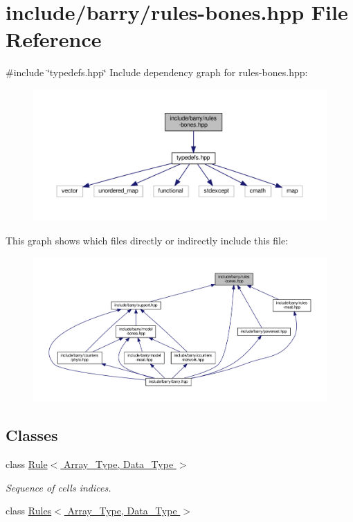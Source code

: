 \hypertarget{rules-bones_8hpp}{}\section{include/barry/rules-\/bones.hpp File Reference}
\label{rules-bones_8hpp}
{\ttfamily \#include \char`\"{}typedefs.\+hpp\char`\"{}}\newline
Include dependency graph for rules-\/bones.hpp\+:
\nopagebreak
\begin{figure}[H]
\begin{center}
\leavevmode
\includegraphics[width=350pt]{rules-bones_8hpp__incl}
\end{center}
\end{figure}
This graph shows which files directly or indirectly include this file\+:
\nopagebreak
\begin{figure}[H]
\begin{center}
\leavevmode
\includegraphics[width=350pt]{rules-bones_8hpp__dep__incl}
\end{center}
\end{figure}
\subsection*{Classes}
\begin{DoxyCompactItemize}
\item 
class \hyperlink{class_rule}{Rule$<$ Array\+\_\+\+Type, Data\+\_\+\+Type $>$}
\begin{DoxyCompactList}\small\item\em Sequence of cells indices. \end{DoxyCompactList}\item 
class \hyperlink{class_rules}{Rules$<$ Array\+\_\+\+Type, Data\+\_\+\+Type $>$}
\end{DoxyCompactItemize}
